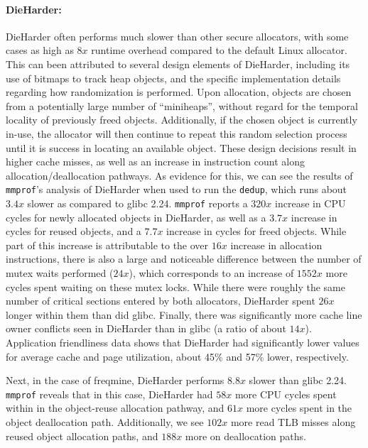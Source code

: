 \paragraph{DieHarder:}
DieHarder often performs much slower than other secure allocators, with some cases as high as $8x$ runtime overhead compared to the default Linux allocator. This can been attributed to several design elements of DieHarder, including its use of bitmaps to track heap objects, and the specific implementation details regarding how randomization is performed. Upon allocation, objects are chosen from a potentially large number of ``miniheaps'', without regard for the temporal locality of previously freed objects. Additionally, if the chosen object is currently in-use, the allocator will then continue to repeat this random selection process until it is success in locating an available object. These design decisions result in higher cache misses, as well as an increase in instruction count along allocation/deallocation pathways.
As evidence for this, we can see the results of \texttt{mmprof}'s analysis of DieHarder when used to run the \texttt{dedup}, which runs about $3.4x$ slower as compared to glibc 2.24. \texttt{mmprof} reports a $320x$ increase in CPU cycles for newly allocated objects in DieHarder, as well as a $3.7x$ increase in cycles for reused objects, and a $7.7x$ increase in cycles for freed objects.
While part of this increase is attributable to the over $16x$ increase in allocation instructions, there is also a large and noticeable difference between the number of mutex waits performed ($24x$), which corresponds to an increase of $1552x$ more cycles spent waiting on these mutex locks. While there were roughly the same number of critical sections entered by both allocators, DieHarder spent $26x$ longer within them than did glibc.
Finally, there was significantly more cache line owner conflicts seen in DieHarder than in glibc (a ratio of about $14x$). Application friendliness data shows that DieHarder had significantly lower values for average cache and page utilization, about 45\% and 57\% lower, respectively.

Next, in the case of freqmine, DieHarder performs $8.8x$ slower than glibc 2.24. \texttt{mmprof} reveals that in this case, DieHarder had $58x$ more CPU cycles spent within in the object-reuse allocation pathway, and $61x$ more cycles spent in the object deallocation path.
	Additionally, we see $102x$ more read TLB misses along reused object allocation paths, and $188x$ more on deallocation paths.
	
